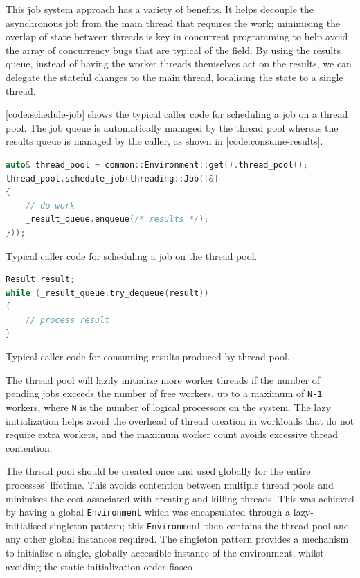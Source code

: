 This job system approach has a variety of benefits. It helps decouple the asynchronous job from the main thread that requires the work; minimising the overlap of state between threads is key in concurrent programming to help avoid the array of concurrency bugs that are typical of the field. By using the results queue, instead of having the worker threads themselves act on the results, we can delegate the stateful changes to the main thread, localising the state to a single thread.

\autoref{code:schedule-job} shows the typical caller code for scheduling a job on a thread pool. The job queue is automatically managed by the thread pool whereas the results queue is managed by the caller, as shown in \autoref{code:consume-results}.

\begin{lstfloat}[H]
    \begin{lstlisting}[language=c++]
auto& thread_pool = common::Environment::get().thread_pool();
thread_pool.schedule_job(threading::Job([&]
{
    // do work
    _result_queue.enqueue(/* results */);
}));
    \end{lstlisting}
    \caption{Typical caller code for scheduling a job on the thread pool.}
    \label{code:schedule-job}
\end{lstfloat}

\begin{lstfloat}[H]
    \begin{lstlisting}[language=c++]
Result result;
while (_result_queue.try_dequeue(result))
{
    // process result
}
    \end{lstlisting}
    \caption{Typical caller code for consuming results produced by thread pool.}
    \label{code:consume-results}
\end{lstfloat}

The thread pool will lazily initialize more worker threads if the number of pending jobs exceeds the number of free workers, up to a maximum of \texttt{N-1} workers, where \texttt{N} is the number of logical processors on the system. The lazy initialization helps avoid the overhead of thread creation in workloads that do not require extra workers, and the maximum worker count avoids excessive thread contention.

The thread pool should be created once and used globally for the entire processes' lifetime. This avoids contention between multiple thread pools and minimises the cost associated with creating and killing threads. This was achieved by having a global \texttt{Environment} which was encapsulated through a lazy-initialised singleton pattern; this \texttt{Environment} then contains the thread pool and any other global instances required. The singleton pattern provides a mechanism to initialize a single, globally accessible instance of the environment, whilst avoiding the static initialization order fiasco \cite{cpp-siof}.

